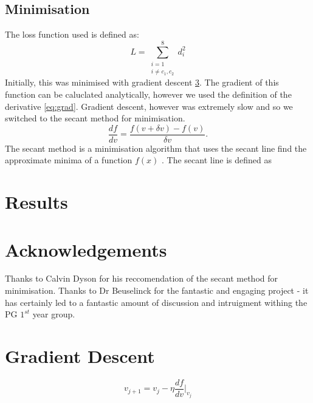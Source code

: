 \documentclass[11pt]{article}
\begin{document}
\subsection{Minimisation}
\label{sec:minimisation}
The loss function used is defined as:
\begin{equation}
    L = \sum\limits_{\substack{i=1 \\ i\neq c_1, c_2}}^{8} d_i^2
    \label{eq:loss}
\end{equation}
Initially, this was minimised with gradient descent \ref{app:gradient-descent}. The gradient of this function can be caluclated analytically, however we used the definition of the derivative \ref{eq:grad}. Gradient descent, however was extremely slow and so we switched to the secant method for minimisation.
\begin{equation}
    \frac{df}{dv} = \frac{f(v + \delta v) - f(v)}{\delta v}.
    \label{eq:grad}
\end{equation}
The secant method is a minimisation algorithm that uses the secant line find the approximate minima of a function $f(x)$ \cite{??}. The secant line is defined as




\section{Results}
\label{sec:results}

\section{Acknowledgements}
\label{sec:acknowledgements}
Thanks to Calvin Dyson for his reccomendation of the secant method for minimisation. Thanks to Dr Beuselinck for the fantastic and engaging project - it has certainly led to a fantastic amount of discussion and intruigment withing the PG $1^{st}$ year group.


\appendix
\section{Gradient Descent}
\label{app:gradient-descent}
\begin{equation}
    v_{j+1} = v_j - \eta \frac{df}{dv}\Bigr|_{v_j}
    \label{eq:iter}
\end{equation}
\end{document}
